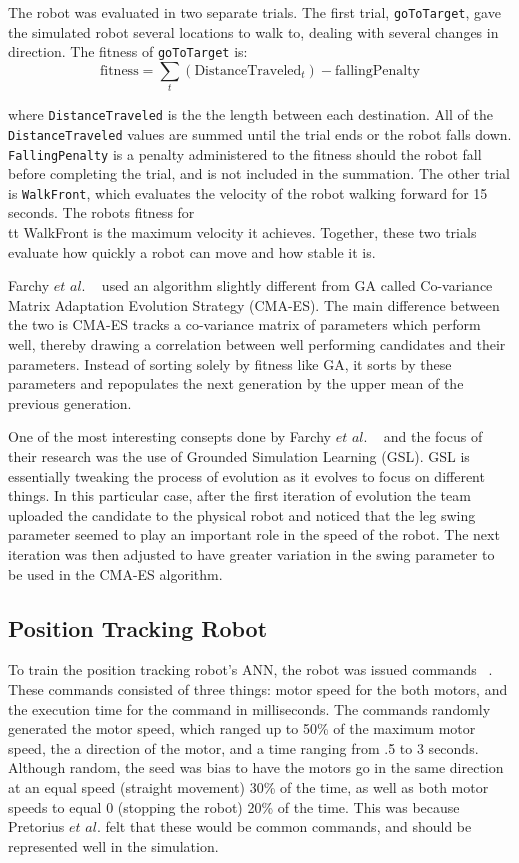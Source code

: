 \documentclass{sig-alternate}
\begin{document}
 The robot was evaluated in two separate trials. The first trial, {\tt goToTarget}, gave the simulated robot several locations to walk to, dealing with several changes in direction. The fitness of {\tt goToTarget} is:
\[
  \textrm{fitness} = \sum_{t} (\textrm{DistanceTraveled}_t) - \textrm{fallingPenalty}
\] 

 where {\tt DistanceTraveled} is the the length between each destination. All  of the {\tt DistanceTraveled} values are summed until the trial ends or the robot falls down. {\tt FallingPenalty} is a penalty administered to the fitness should the robot fall before completing the trial, and is not included in the summation. The other trial is {\tt WalkFront}, which evaluates the velocity of the robot walking forward for 15 seconds. The robots fitness for {\\tt WalkFront} is the maximum velocity it achieves. Together, these two trials evaluate how quickly a robot can move and how stable it is.
  
  Farchy $et$ $al.$ ~\cite{Farchy:2013:HRL:2484920.2484930} used an algorithm slightly different from GA called Co-variance Matrix Adaptation Evolution Strategy (CMA-ES). The main difference between the two is CMA-ES tracks a co-variance matrix of parameters which perform well, thereby drawing a correlation between well performing candidates and their parameters. Instead of sorting solely by fitness like GA, it sorts by these parameters and repopulates the next generation by the upper mean of the previous generation.
  
  One of the most interesting consepts done by Farchy $et$ $al.$ ~\cite{Farchy:2013:HRL:2484920.2484930} and the focus of their research was the use of Grounded Simulation Learning (GSL). GSL is essentially tweaking the process of evolution as it evolves to focus on different things. In this particular case, after the first iteration of evolution the team uploaded the candidate to the physical robot and noticed that the leg swing parameter seemed to play an important role in the speed of the robot. The next iteration was then adjusted to have greater variation in the swing parameter to be used in the CMA-ES algorithm.

  \subsection{Position Tracking Robot}\label{Pretorius Evolving}
  To train the position tracking robot's ANN, the robot was issued commands ~\cite{Pretorius:2009:TAN:1632149.1632171}. These commands consisted of three things: motor speed for the both motors, and the execution time for the command in milliseconds. The commands randomly generated the motor speed, which ranged up to 50\% of the maximum motor speed, the a direction of the motor, and a time ranging from .5 to 3 seconds. Although random, the seed was bias to have the motors go in the same direction at an equal speed (straight movement) 30\% of the time, as well as both motor speeds to equal 0 (stopping the robot) 20\% of the time. This was because  Pretorius $et$ $al.$ felt that these would be common commands, and should be represented well in the simulation.
  
\end{document}
